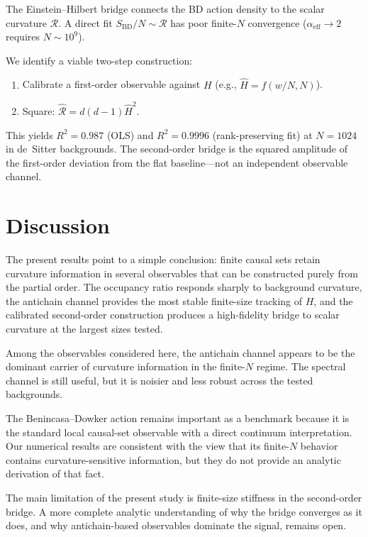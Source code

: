 \documentclass[12pt,a4paper]{article}
\newcommand{\SBD}{S_{\mathrm{BD}}}
\begin{document}
The Einstein--Hilbert bridge connects the BD action density to the scalar
curvature $\mathcal{R}$.
A direct fit $\SBD/N \sim \mathcal{R}$ has poor finite-$N$ convergence
($\alpha_{\mathrm{eff}}\to 2$ requires $N\sim 10^9$).

We identify a viable two-step construction:
\begin{enumerate}
\item Calibrate a first-order observable against $H$
  (e.g., $\hat{H} = f(w/N, N)$).
\item Square: $\hat{\mathcal{R}} = d(d-1)\hat{H}^2$.
\end{enumerate}

This yields $R^2 = 0.987$ (OLS) and $R^2 = 0.9996$ (rank-preserving fit)
at $N=1024$ in de~Sitter backgrounds.
The second-order bridge is the squared amplitude of the first-order deviation
from the flat baseline---not an independent observable channel.

\section{Discussion}

The present results point to a simple conclusion: finite causal sets retain
curvature information in several observables that can be constructed purely
from the partial order. The occupancy ratio responds sharply to background
curvature, the antichain channel provides the most stable finite-size tracking
of $H$, and the calibrated second-order construction produces a high-fidelity
bridge to scalar curvature at the largest sizes tested.

Among the observables considered here, the antichain channel appears to be the
dominant carrier of curvature information in the finite-$N$ regime. The spectral
channel is still useful, but it is noisier and less robust across the tested
backgrounds.

The Benincasa--Dowker action remains important as a benchmark because it is the
standard local causal-set observable with a direct continuum interpretation.
Our numerical results are consistent with the view that its finite-$N$ behavior
contains curvature-sensitive information, but they do not provide an analytic
derivation of that fact.

The main limitation of the present study is finite-size stiffness in the
second-order bridge. A more complete analytic understanding of why the bridge
converges as it does, and why antichain-based observables dominate the signal,
remains open.
\end{document}
